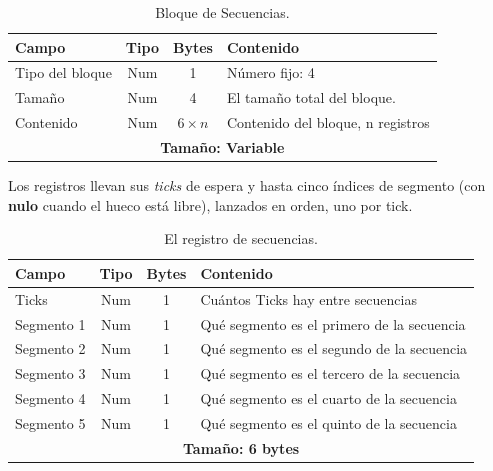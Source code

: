 \begin{table}[H]
	\centering
	\begin{tabular}{|l|c|c|p{8.4cm}|}
		\hline
		\textbf{Campo} & \textbf{Tipo} & \textbf{Bytes} & \textbf{Contenido} \\
		\hline
		
		Tipo del bloque & Num & 1 & Número fijo: 4\\ \hline
		
		Tamaño & Num & 4 & El tamaño total del bloque. \\ \hline
		
		Contenido & Num & $6 \times n$ & Contenido del bloque, n registros\\
		
		\hline\hline
		\multicolumn{4}{c}{\textbf{Tamaño: Variable}} \\ \hline
	\end{tabular}
	\caption{Bloque de Secuencias.}
	\label{tab:bloqueSecuencias}
\end{table}

Los registros llevan sus \textit{ticks} de espera y
hasta cinco índices de segmento (con \textbf{nulo} cuando el
hueco está libre), lanzados en orden, uno por tick.

\begin{table}[H]
	\centering
	\begin{tabular}{|l|c|c|p{8.4cm}|}
		\hline
		\textbf{Campo} & \textbf{Tipo} & \textbf{Bytes} & \textbf{Contenido} \\
		\hline
		
		Ticks & Num & 1 & Cuántos Ticks hay entre secuencias \\ \hline
		Segmento 1 & Num & 1 & Qué segmento es el primero de la secuencia \\ \hline
		Segmento 2 & Num & 1 & Qué segmento es el segundo de la secuencia \\ \hline
		Segmento 3 & Num & 1 & Qué segmento es el tercero de la secuencia \\ \hline
		Segmento 4 & Num & 1 & Qué segmento es el cuarto de la secuencia \\ \hline
		Segmento 5 & Num & 1 & Qué segmento es el quinto de la secuencia \\
		
		\hline\hline
		\multicolumn{4}{c}{\textbf{Tamaño: 6 bytes}} \\ \hline
	\end{tabular}
	\caption{El registro de secuencias.}
	\label{tab:registroSecuencias}
\end{table}

